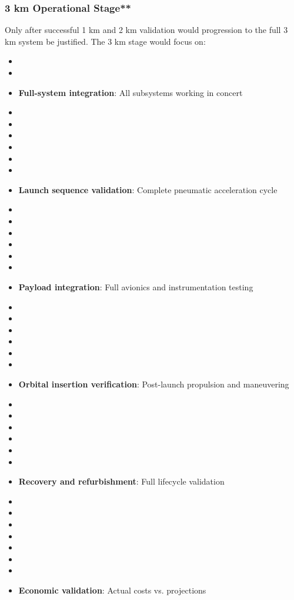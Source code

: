 \subsubsection{3 km Operational Stage**}
Only after successful 1 km and 2 km validation would progression to the full 3 km system be justified. The 3 km stage would focus on:
\begin{itemize}
    \item \item \item \textbf{Full-system integration}: All subsystems working in concert
    \item \item \item \item \item \item \item \textbf{Launch sequence validation}: Complete pneumatic acceleration cycle
    \item \item \item \item \item \item \item \textbf{Payload integration}: Full avionics and instrumentation testing
    \item \item \item \item \item \item \item \textbf{Orbital insertion verification}: Post-launch propulsion and maneuvering
    \item \item \item \item \item \item \item \textbf{Recovery and refurbishment}: Full lifecycle validation
    \item \item \item \item \item \item \item \item \textbf{Economic validation}: Actual costs vs. projections \cite{huffman2010}
\end{itemize}


